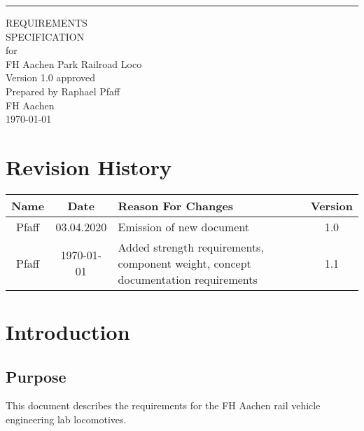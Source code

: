 \documentclass{scrreprt}
\date{}
\def\myversion{1.0 }
\begin{document}
\begin{flushright}
    \rule{16cm}{5pt}\vskip1cm
    \begin{bfseries}
        \Huge{REQUIREMENTS\\ SPECIFICATION}\\
        \vspace{1.9cm}
        for\\
        \vspace{1.9cm}
        FH Aachen Park Railroad Loco\\
        \vspace{1.9cm}
        \LARGE{Version \myversion approved}\\
        \vspace{1.9cm}
        Prepared by Raphael Pfaff\\
        \vspace{1.9cm}
        FH Aachen\\
        \vspace{1.9cm}
        \today\\
    \end{bfseries}
\end{flushright}

\tableofcontents


\chapter*{Revision History}

\begin{center}
    \begin{tabular}{|c|c|p{10cm}|c|}
        \hline
	    Name & Date & Reason For Changes & Version\\
        \hline
	    Pfaff & 03.04.2020 & Emission of new document & 1.0\\
        \hline
	    Pfaff & \today & Added strength requirements, component weight, concept documentation requirements &  1.1 \\
        \hline
    \end{tabular}
\end{center}

\chapter{Introduction}

\section{Purpose}
This document describes the requirements for the FH Aachen rail vehicle engineering lab locomotives.
\end{document}
